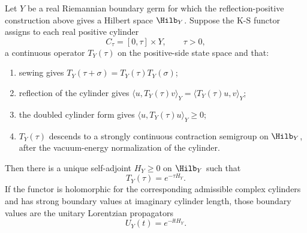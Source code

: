 \begin{theorem}
\label{thm:ks-cylinder-positive-energy}
Let \(Y\) be a real Riemannian boundary germ for which the reflection-positive
construction above gives a Hilbert space \(\Hilb_Y\).  Suppose the K-S functor
assigns to each real positive cylinder
\[
  C_\tau=[0,\tau]\times Y,\qquad \tau>0,
\]
a continuous operator \(T_Y(\tau)\) on the positive-side state space and that:
\begin{enumerate}
\item sewing gives \(T_Y(\tau+\sigma)=T_Y(\tau)T_Y(\sigma)\);
\item reflection of the cylinder gives
      \(\langle u,T_Y(\tau)v\rangle_Y
        =\langle T_Y(\tau)u,v\rangle_Y\);
\item the doubled cylinder form gives
      \(\langle u,T_Y(\tau)u\rangle_Y\ge0\);
\item \(T_Y(\tau)\) descends to a strongly continuous contraction semigroup on
      \(\Hilb_Y\), after the vacuum-energy normalization of the cylinder.
\end{enumerate}
Then there is a unique self-adjoint \(H_Y\ge0\) on \(\Hilb_Y\) such that
\[
  T_Y(\tau)=e^{-\tau H_Y}.
\]
If the functor is holomorphic for the corresponding admissible complex
cylinders and has strong boundary values at imaginary cylinder length, those
boundary values are the unitary Lorentzian propagators
\[
  U_Y(t)=e^{-\ii tH_Y}.
\]
\end{theorem}

